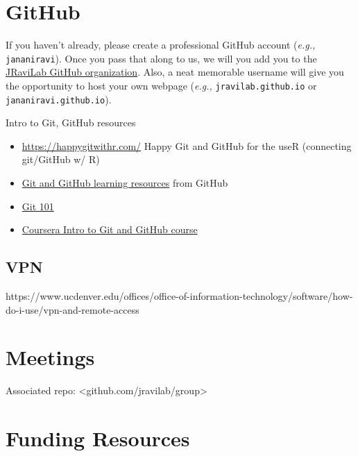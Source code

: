 \documentclass[
  letterpaper,
  DIV=11,
  numbers=noendperiod]{scrreprt}
\begin{document}
\hypertarget{github}{%
\chapter{GitHub}\label{github}}

If you haven't already, please create a professional GitHub account
(\emph{e.g.,} \texttt{jananiravi}). Once you pass that along to us, we
will you add you to the \href{//github.com/jravilab}{JRaviLab GitHub
organization}. Also, a neat memorable username will give you the
opportunity to host your own webpage (\emph{e.g.,}
\texttt{jravilab.github.io} or \texttt{jananiravi.github.io}).

Intro to Git, GitHub resources

\begin{itemize}
\item
  \url{https://happygitwithr.com/} Happy Git and GitHub for the useR
  (connecting git/GitHub w/ R)
\item
  \href{https://docs.github.com/en/get-started/quickstart/git-and-github-learning-resources}{Git
  and GitHub learning resources} from GitHub
\item
  \href{https://product.hubspot.com/blog/git-and-github-tutorial-for-beginners}{Git
  101}
\item
  \href{https://www.coursera.org/learn/introduction-git-github}{Coursera
  Intro to Git and GitHub course}
\end{itemize}

\hypertarget{vpn}{%
\section{VPN}\label{vpn}}

https://www.ucdenver.edu/offices/office-of-information-technology/software/how-do-i-use/vpn-and-remote-access


\hypertarget{meetings}{%
\chapter{Meetings}\label{meetings}}

Associated repo: \textless github.com/jravilab/group\textgreater{}


\hypertarget{funding-resources}{%
\chapter{Funding Resources}\label{funding-resources}}
\end{document}
